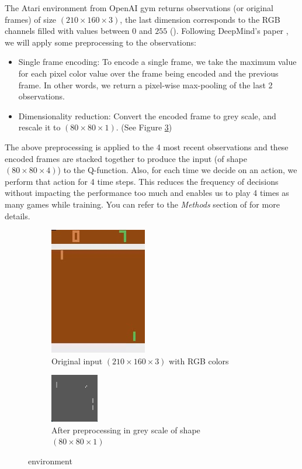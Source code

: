 \documentclass{article}
\newenvironment{myitemize}
{ \begin{itemize}
		\setlength{\itemsep}{0pt}
		\setlength{\parskip}{0pt}
		\setlength{\parsep}{0pt}     }
	{ \end{itemize}                  }
\begin{document}
The Atari environment from OpenAI gym returns observations (or original frames) of size $ (210 \times 160 \times 3) $, the last dimension corresponds to the RGB channels filled with values between $ 0 $ and $ 255 $ (). Following DeepMind's paper \cite{mnih2015human}, we will apply some preprocessing to the observations:
\begin{myitemize}
\item Single frame encoding: To encode a single frame, we take the maximum value for each pixel color value over the frame being encoded and the previous frame. In other words, we return a pixel-wise max-pooling of the last 2 observations.
\item Dimensionality reduction: Convert the encoded frame to grey scale, and rescale it to $(80 \times 80 \times 1)$. (See Figure \ref{fig:pong_env})
\end{myitemize}

The above preprocessing is applied to the 4 most recent observations and these encoded frames are stacked together to produce the input (of shape $(80 \times 80 \times 4)$) to the Q-function. Also, for each time we decide on an action, we perform that action for 4 time steps. This reduces the frequency of decisions without impacting the performance too much and enables us to play 4 times as many games while training. You can refer to the \textit{Methods} section of \cite{mnih2015human} for more details.       \\

\begin{figure}[H]
\centering
\begin{subfigure}[b]{.5\textwidth}
  \centering
  \includegraphics[width=.25\linewidth]{pong}
  \caption{Original input $ (210 \times 160 \times 3) $ with RGB colors}
  \label{fig:pong}
\end{subfigure}
\begin{subfigure}[b]{.5\textwidth}
  \centering
  \includegraphics[width=.15\linewidth]{pong_grey}
  \caption{After preprocessing in grey scale of shape $ (80 \times 80 \times 1 ) $}
  \label{fig:pong_grey}
\end{subfigure}
\caption{ environment}
\label{fig:pong_env}
\end{figure}
\end{document}
